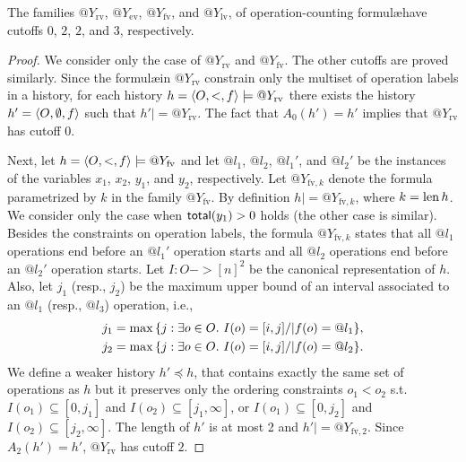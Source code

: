 \begin{theorem}
  \label{lem:cutoff}

  The families $@Y_\mathrm{rv}$, $@Y_\mathrm{ev}$, $@Y_\mathrm{fv}$, and
  $@Y_\mathrm{lv}$, of operation-counting formul\ae have cutoffs $0$, $2$, $2$,
  and $3$, respectively.

\end{theorem}

\begin{proof}

  We consider only the case of $@Y_\mathrm{rv}$ and $@Y_\mathrm{fv}$. The other
  cutoffs are proved similarly. Since the formul\ae in $@Y_\mathrm{rv}$
  constrain only the multiset of operation labels in a history, for each
  history $h = \left\langle {O,<,f} \right\rangle |= @Y_\mathrm{rv}$ there exists the history $h' =
  \left\langle {O,\emptyset,f} \right\rangle$ such that $h' |= @Y_\mathrm{rv}$. The fact that $A_0(h')
  = h'$ implies that $@Y_\mathrm{rv}$ has cutoff $0$.
 
  Next, let $h = \left\langle {O,<,f} \right\rangle |= @Y_\mathrm{fv}$ and let $@l_1$, $@l_2$,
  $@l_1'$, and $@l_2'$ be the instances of the variables $x_1$, $x_2$, $y_1$,
  and $y_2$, respectively. Let $@Y_{\mathrm{fv},k}$ denote the formula
  parametrized by $k$ in the family $@Y_\mathrm{fv}$. By definition $h |=
  @Y_{\mathrm{fv},k}$, where $k = \operatorname{len} h$. We consider only the case when
  $\mathsf{total}(y_1)>0$ holds (the other case is similar). Besides the constraints on
  operation labels, the formula $@Y_{\mathrm{fv},k}$ states that all $@l_1$
  operations end before an $@l_1'$ operation starts and all $@l_2$ operations
  end before an $@l_2'$ operation starts. Let $I:O->[n]^2$ be the canonical
  representation of $h$. Also, let $j_1$ (resp., $j_2$) be the maximum upper
  bound of an interval associated to an $@l_1$ (resp., $@l_3$) operation, i.e.,
  \begin{align*}
    j_1 = \max{\{ j:\exists o\in O.\ I(o) = [i,j] /| f(o)=@l_1 \}}, \\
    j_2 = \max{\{ j:\exists o\in O.\ I(o) = [i,j] /| f(o)=@l_2 \}}.
  \end{align*}
  We define a weaker history $h'\preceq h$, that contains exactly the same set
  of operations as $h$ but it preserves only the ordering constraints $o_1<o_2$
  s.t. $I(o_1)\subseteq [0,j_1]$ and $I(o_2)\subseteq [j_1,\infty]$, or
  $I(o_1)\subseteq [0,j_2]$ and $I(o_2)\subseteq [j_2,\infty]$. The length of
  $h'$ is at most 2
  and $h'|= @Y_{\mathrm{fv},2}$. Since $A_2(h') = h'$, $@Y_\mathrm{rv}$ has
  cutoff $2$.
\end{proof}

